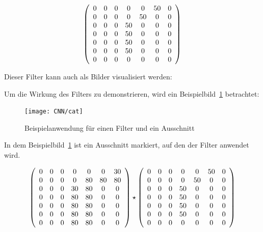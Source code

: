 $$\left(
\begin{array}{ccc ccc c}
    0 & 0 & 0 &  0 & 0  & 50 & 0 \\
    0 & 0 & 0 &  0 & 50 &  0 & 0 \\
    0 & 0 & 0 & 50 &  0 &  0 & 0 \\
    0 & 0 & 0 & 50 &  0 &  0 & 0 \\
    0 & 0 & 0 & 50 &  0 &  0 & 0 \\
    0 & 0 & 0 & 50 &  0 &  0 & 0 \\
    0 & 0 & 0 &  0 &  0 &  0 & 0 \\
\end{array}
\right)
$$  

Dieser Filter kann auch als Bilder visualisiert werden:




Um die Wirkung des Filters zu demonstrieren, wird ein Beispielbild~\ref{concept:FilterCat} betrachtet:


\begin{figure}
  \centering    

  \texttt{[image: CNN/cat]}
    
  \caption{Beispielanwendung für einen Filter und ein Ausschnitt}\label{concept:FilterCat}
\end{figure}

In dem Beispielbild~\ref{concept:FilterCat} ist ein Ausschnitt markiert, auf den der Filter anwendet wird. 



$$
\left(
\begin{array}{ccc ccc c}
    0 & 0 & 0 &  0 & 0  &  0 & 30 \\
    0 & 0 & 0 &  0 & 80 & 80 & 80 \\
    0 & 0 & 0 & 30 & 80 &  0 &  0 \\
    0 & 0 & 0 & 80 & 80 &  0 &  0 \\
    0 & 0 & 0 & 80 & 80 &  0 &  0 \\
    0 & 0 & 0 & 80 & 80 &  0 &  0 \\
    0 & 0 & 0 & 80 & 80 &  0 &  0 \\
\end{array}
\right)
\star
\left(
\begin{array}{ccc ccc c}
    0 & 0 & 0 &  0 & 0  & 50 & 0 \\
    0 & 0 & 0 &  0 & 50 &  0 & 0 \\
    0 & 0 & 0 & 50 &  0 &  0 & 0 \\
    0 & 0 & 0 & 50 &  0 &  0 & 0 \\
    0 & 0 & 0 & 50 &  0 &  0 & 0 \\
    0 & 0 & 0 & 50 &  0 &  0 & 0 \\
    0 & 0 & 0 &  0 &  0 &  0 & 0 \\
\end{array}
\right)$$

